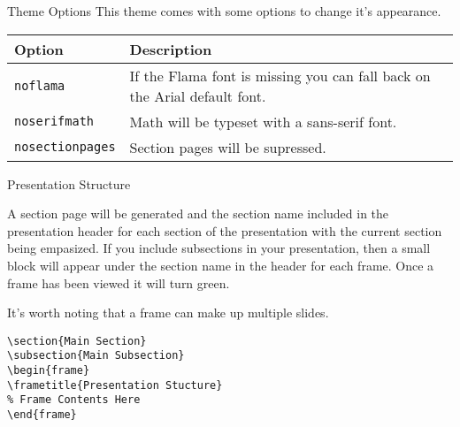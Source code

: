 \documentclass[compress]{beamer}
\begin{document}
\begin{frame}{Theme Options}
This theme comes with some options to change it's appearance.
\begin{table}[]
	\begin{tabularx}{\linewidth}{l>{\raggedright}X}
		\toprule
		\textbf{Option}			& \textbf{Description} \tabularnewline
		\midrule
		\texttt{noflama}		& If the Flama font is missing you can fall back on the Arial default font. \tabularnewline
		\texttt{noserifmath}		& Math will be typeset with a sans-serif font. \tabularnewline
		\texttt{nosectionpages} & Section pages will be supressed.\tabularnewline
		\bottomrule
	\end{tabularx}
	\label{tab:options}
\end{table}
\end{frame}


\begin{frame}[containsverbatim]{Presentation Structure}

A section page will be generated and the section name included in the presentation header for each section of the presentation with the current section being empasized.  If you include subsections in your presentation, then a small block will appear under the section name in the header for each frame.  Once a frame has been viewed it will turn green.

It's worth noting that a frame can make up multiple slides.

\begin{lstlisting}
\section{Main Section}
\subsection{Main Subsection}
\begin{frame}
\frametitle{Presentation Stucture}
% Frame Contents Here
\end{frame}
\end{lstlisting}
\end{frame}

\end{document}
